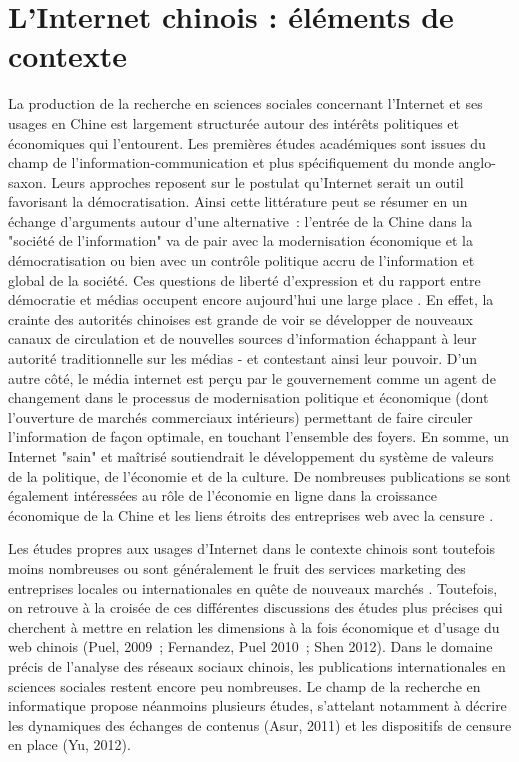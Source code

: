 \section{L’Internet chinois : éléments de contexte }
La production de la recherche en sciences sociales concernant l’Internet et ses usages en Chine est largement structurée autour des intérêts politiques et économiques qui l’entourent. Les premières études académiques sont issues du champ de l’information-communication et plus spécifiquement du monde anglo-saxon. Leurs approches reposent sur le postulat qu'Internet serait un outil favorisant la démocratisation. Ainsi cette littérature peut se résumer en un échange d'arguments autour d'une alternative : l'entrée de la Chine dans la "société de l'information" va de pair avec la modernisation économique et la démocratisation ou bien avec un contrôle politique accru de l'information et global de la société. Ces questions de liberté d’expression et du rapport entre démocratie et médias occupent encore aujourd’hui une large place \cite{MacKinnon2009, Douzet2007, Yang2008}. En effet, la crainte des autorités chinoises est grande de voir se développer de nouveaux canaux de circulation et de nouvelles sources d'information échappant à leur autorité traditionnelle sur les médias - et contestant ainsi leur pouvoir. D'un autre côté, le média internet est perçu par le gouvernement comme un agent de changement dans le processus de modernisation politique et économique (dont l’ouverture de marchés commerciaux intérieurs) permettant de faire circuler l’information de façon optimale, en touchant l’ensemble des foyers. En somme, un Internet "sain" et maîtrisé soutiendrait le développement du système de valeurs de la politique, de l’économie et de la culture. De nombreuses publications se sont également intéressées au rôle de l’économie en ligne dans la croissance économique de la Chine et les liens étroits des entreprises web avec la censure \cite{Dann2008}.

Les études propres aux usages d’Internet dans le contexte chinois sont toutefois moins nombreuses ou sont généralement le fruit des services marketing des entreprises locales ou internationales en quête de nouveaux marchés \cite{Hwang2005, Bergstrom2012}. Toutefois, on retrouve à la croisée de ces différentes discussions des études plus précises qui cherchent à mettre en relation les dimensions à la fois économique et d’usage du web chinois (Puel, 2009 ; Fernandez, Puel 2010 ; Shen 2012). Dans le domaine précis de l’analyse des réseaux sociaux chinois, les publications internationales en sciences sociales restent encore peu nombreuses. Le champ de la recherche en informatique propose néanmoins plusieurs études, s’attelant notamment à décrire les dynamiques des échanges de contenus (Asur, 2011) et les dispositifs de censure en place (Yu, 2012). 

